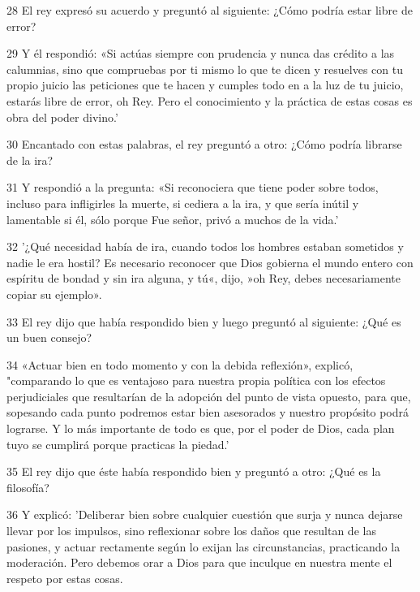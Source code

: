 \par 28 El rey expresó su acuerdo y preguntó al siguiente: ¿Cómo podría estar libre de error?

\par 29 Y él respondió: «Si actúas siempre con prudencia y nunca das crédito a las calumnias, sino que compruebas por ti mismo lo que te dicen y resuelves con tu propio juicio las peticiones que te hacen y cumples todo en a la luz de tu juicio, estarás libre de error, oh Rey. Pero el conocimiento y la práctica de estas cosas es obra del poder divino.'

\par 30 Encantado con estas palabras, el rey preguntó a otro: ¿Cómo podría librarse de la ira?

\par 31 Y respondió a la pregunta: «Si reconociera que tiene poder sobre todos, incluso para infligirles la muerte, si cediera a la ira, y que sería inútil y lamentable si él, sólo porque Fue señor, privó a muchos de la vida.'

\par 32 '¿Qué necesidad había de ira, cuando todos los hombres estaban sometidos y nadie le era hostil? Es necesario reconocer que Dios gobierna el mundo entero con espíritu de bondad y sin ira alguna, y tú«, dijo, »oh Rey, debes necesariamente copiar su ejemplo».

\par 33 El rey dijo que había respondido bien y luego preguntó al siguiente: ¿Qué es un buen consejo?

\par 34 «Actuar bien en todo momento y con la debida reflexión», explicó, "comparando lo que es ventajoso para nuestra propia política con los efectos perjudiciales que resultarían de la adopción del punto de vista opuesto, para que, sopesando cada punto podremos estar bien asesorados y nuestro propósito podrá lograrse. Y lo más importante de todo es que, por el poder de Dios, cada plan tuyo se cumplirá porque practicas la piedad.'

\par 35 El rey dijo que éste había respondido bien y preguntó a otro: ¿Qué es la filosofía?

\par 36 Y explicó: 'Deliberar bien sobre cualquier cuestión que surja y nunca dejarse llevar por los impulsos, sino reflexionar sobre los daños que resultan de las pasiones, y actuar rectamente según lo exijan las circunstancias, practicando la moderación. Pero debemos orar a Dios para que inculque en nuestra mente el respeto por estas cosas.

